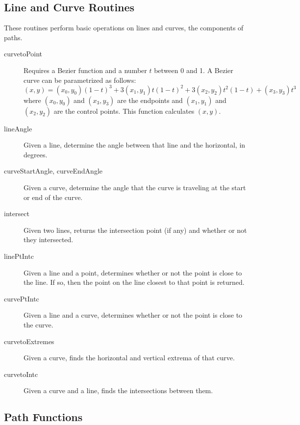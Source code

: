 \documentclass[12pt]{article}
\begin{document}
\subsection{Line and Curve Routines}

These routines perform basic operations on lines and curves, the components of
paths.

\begin{description}
\item[curvetoPoint] Requires a Bezier function and a number $t$ between 0 and 1.
A Bezier curve can be parametrized as follows:
\[
(x,y) = (x_0,y_0)(1-t)^3 + 3(x_1,y_1)t(1-t)^2 + 3(x_2,y_2)t^2(1-t) +
(x_3,y_3)t^3
\]
where $(x_0,y_0)$ and $(x_3,y_3)$ are the endpoints and $(x_1,y_1)$ and
$(x_2,y_2)$ are the control points. This function calculates $(x,y)$.

\item[lineAngle] Given a line, determine the angle between that line and the
horizontal, in degrees.

\item[curveStartAngle, curveEndAngle] Given a curve, determine the angle that
the curve is traveling at the start or end of the curve.

\item[intersect] Given two lines, returns the intersection point (if any) and
whether or not they intersected.

\item[linePtIntc] Given a line and a point, determines whether or not the point
is close to the line. If so, then the point on the line closest to that point is
returned.

\item[curvePtIntc] Given a line and a curve, determines whether or not the point
is close to the curve.

\item[curvetoExtremes] Given a curve, finds the horizontal and vertical extrema
of that curve.

\item[curvetoIntc] Given a curve and a line, finds the intersections between
them.

\end{description}

\subsection{Path Functions}
\end{document}
